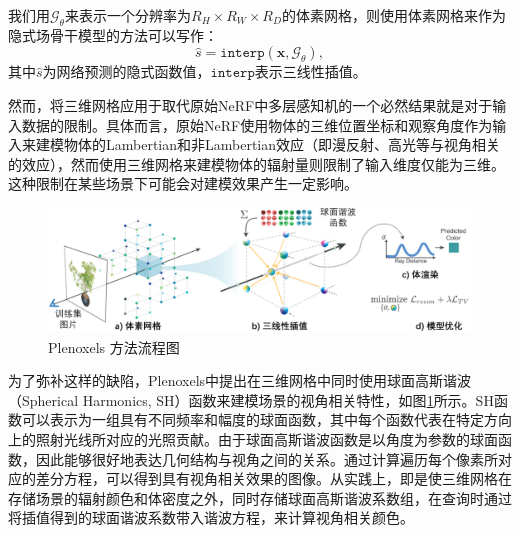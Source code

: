我们用$\mathcal{G}_\theta$来表示一个分辨率为$R_H\times R_W\times R_D$的体素网格，则使用体素网格来作为隐式场骨干模型的方法可以写作：
\begin{equation}
    \hat{s} = \mathtt{interp}(\mathbf{x}, \mathcal{G}_\theta),
\end{equation}
其中$\hat{s}$为网络预测的隐式函数值，$\mathtt{interp}$表示三线性插值。

然而，将三维网格应用于取代原始NeRF中多层感知机的一个必然结果就是对于输入数据的限制。具体而言，原始NeRF使用物体的三维位置坐标和观察角度作为输入来建模物体的Lambertian和非Lambertian效应（即漫反射、高光等与视角相关的效应），然而使用三维网格来建模物体的辐射量则限制了输入维度仅能为三维。这种限制在某些场景下可能会对建模效果产生一定影响。

\begin{figure}[ht]
    \centering
    \includegraphics[width=\textwidth]{undergraduate-thesis/images/related-work/plenoxels.pdf}
    \caption{Plenoxels\cite{fridovich-keil_plenoxels_2022} 方法流程图}
    \label{fig:related-work plenoxels pipeline}
\end{figure}

为了弥补这样的缺陷，Plenoxels\cite{fridovich-keil_plenoxels_2022}中提出在三维网格中同时使用球面高斯谐波（Spherical Harmonics, SH）函数来建模场景的视角相关特性，如图\ref{fig:related-work plenoxels pipeline}所示。SH函数可以表示为一组具有不同频率和幅度的球面函数，其中每个函数代表在特定方向上的照射光线所对应的光照贡献。由于球面高斯谐波函数是以角度为参数的球面函数，因此能够很好地表达几何结构与视角之间的关系。通过计算遍历每个像素所对应的差分方程，可以得到具有视角相关效果的图像。从实践上，即是使三维网格在存储场景的辐射颜色和体密度之外，同时存储球面高斯谐波系数组，在查询时通过将插值得到的球面谐波系数带入谐波方程，来计算视角相关颜色。 

